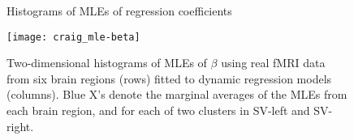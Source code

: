 \begin{figure}
\ssp
\centering
\caption{Histograms of MLEs of regression coefficients} \label{fig:fmri:mle:beta}
\texttt{[image: craig\_mle-beta]}
\caption*{Two-dimensional histograms of MLEs of $\beta$ using real fMRI data from six brain regions (rows) fitted to dynamic regression models (columns). Blue X's denote the marginal averages of the MLEs from each brain region, and for each of two clusters in SV-left and SV-right.}
\end{figure}

%

